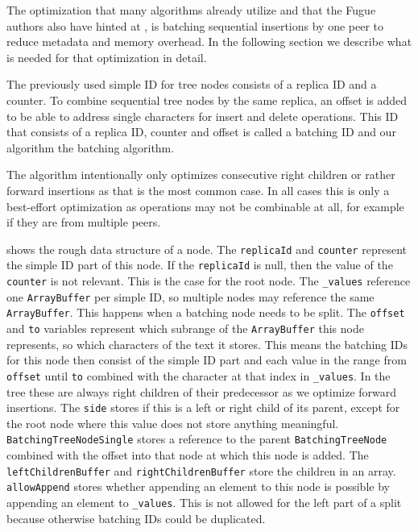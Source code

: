 The optimization that many algorithms already utilize and that the Fugue authors also have hinted at \cite[Section 5]{2023-weidner-minimizing-interleaving}, is batching sequential insertions by one peer to reduce metadata and memory overhead. In the following section we describe what is needed for that optimization in detail.

The previously used \gls{simple ID} for tree nodes consists of a replica ID and a counter. To combine sequential tree nodes by the same replica, an offset is added to be able to address single characters for insert and delete operations. This ID that consists of a replica ID, counter and offset is called a \gls{batching ID} and our algorithm the \gls{batching algorithm}.

The algorithm intentionally only optimizes consecutive right children or rather forward insertions as that is the most common case. In all cases this is only a best-effort optimization as operations may not be combinable at all, for example if they are from multiple peers.

 shows the rough data structure of a node. The \texttt{replicaId} and \texttt{counter} represent the \gls{simple ID} part of this node. If the \texttt{replicaId} is null, then the value of the \texttt{counter} is not relevant. This is the case for the root node. The \texttt{\_values} reference one \texttt{ArrayBuffer} per \gls{simple ID}, so multiple nodes may reference the same \texttt{ArrayBuffer}. This happens when a batching node needs to be split. The \texttt{offset} and \texttt{to} variables represent which subrange of the \texttt{ArrayBuffer} this node represents, so which characters of the text it stores. This means the \glspl{batching ID} for this node then consist of the \gls{simple ID} part and each value in the range from \texttt{offset} until \texttt{to} combined with the character at that index in \texttt{\_values}. In the tree these are always right children of their predecessor as we optimize forward insertions. The \texttt{side} stores if this is a left or right child of its parent, except for the root node where this value does not store anything meaningful. \texttt{BatchingTreeNodeSingle} stores a reference to the parent \texttt{BatchingTreeNode} combined with the offset into that node at which this node is added. The \texttt{leftChildrenBuffer} and \texttt{rightChildrenBuffer} store the children in an array. \texttt{allowAppend} stores whether appending an element to this node is possible by appending an element to \texttt{\_values}. This is not allowed for the left part of a split because otherwise \glspl{batching ID} could be duplicated.

